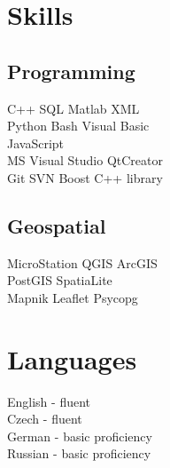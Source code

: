 \documentclass[letterpaper]{deedy-resume} %
\begin{document}
\begin{minipage}[t]{0.33\textwidth}

%
%
%


\section{Skills}

\subsection{Programming}

C++ \textbullet{} SQL \textbullet{} Matlab \textbullet{} XML \\
Python \textbullet{} Bash \textbullet{} Visual Basic \\ 
\textbullet{} JavaScript \\
MS Visual Studio \textbullet{} QtCreator \\
 \textbullet{} Git \textbullet{} SVN \textbullet{} Boost C++ library\\
\sectionspace %
\subsection{Geospatial}
MicroStation\textbullet{} QGIS \textbullet{} ArcGIS \\
PostGIS \textbullet{} SpatiaLite \\
Mapnik \textbullet{} Leaflet \textbullet{} Psycopg \\

\sectionspace %


\section{Languages}
English - fluent \\
Czech - fluent \\
German - basic proficiency \\
Russian - basic proficiency \\



\sectionspace %

\end{minipage} %
\end{document}
